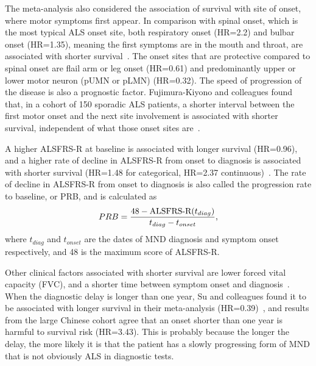 The meta-analysis also considered the association of survival with site of onset, where motor symptoms first appear.
In comparison with spinal onset, which is the most typical ALS onset site, both respiratory onset (HR=2.2) and bulbar onset (HR=1.35), meaning the first symptoms are in the mouth and throat, are associated with shorter survival~\cite{suPredictorsSurvivalPatients2021}.
The onset sites that are protective compared to spinal onset are flail arm or leg onset (HR=0.61) and predominantly upper or lower motor neuron (pUMN or pLMN) (HR=0.32).
The speed of progression of the disease is also a prognostic factor. Fujimura-Kiyono and colleagues found that, in a cohort of 150 sporadic ALS patients, a shorter interval between the first motor onset and the next site involvement is associated with shorter survival, independent of what those onset sites are~\cite{fujimura-kiyonoOnsetSpreadingPatterns2011a}.

A higher ALSFRS-R at baseline is associated with longer survival (HR=0.96), and a higher rate of decline in ALSFRS-R from onset to diagnosis is associated with shorter survival (HR=1.48 for categorical, HR=2.37 continuous)~\cite{suPredictorsSurvivalPatients2021}.
The rate of decline in ALSFRS-R from onset to diagnosis is also called the progression rate to baseline, or PRB, and is calculated as
\begin{equation}
    PRB = \frac{48-\textnormal{ALSFRS-R}(t_{diag})}{t_{diag}-t_{onset}},
\end{equation}
where $t_{diag}$ and $t_{onset}$ are the dates of MND diagnosis and symptom onset respectively, and 48 is the maximum score of ALSFRS-R.

Other clinical factors associated with shorter survival are lower forced vital capacity (FVC), and a shorter time between symptom onset and diagnosis~\cite{suPredictorsSurvivalPatients2021}.
When the diagnostic delay is longer than one year, Su and colleagues found it to be associated with longer survival in their meta-analysis (HR=0.39)~\cite{suPredictorsSurvivalPatients2021}, and results from the large Chinese cohort agree that an onset shorter than one year is harmful to survival risk (HR=3.43).
This is probably because the longer the delay, the more likely it is that the patient has a slowly progressing form of MND that is not obviously ALS in diagnostic tests.

